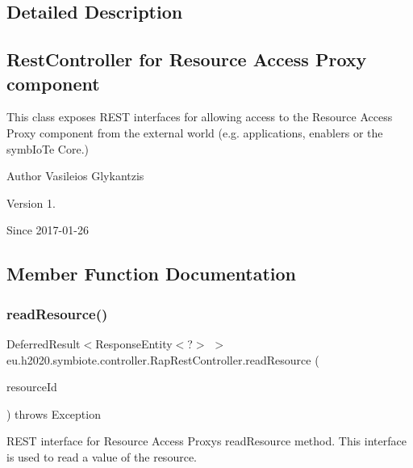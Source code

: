 \subsection{Detailed Description}
\subsection*{Rest\+Controller for Resource Access Proxy component}

This class exposes R\+E\+ST interfaces for allowing access to the Resource Access Proxy component from the external world (e.\+g. applications, enablers or the symb\+Io\+Te Core.)

\begin{DoxyAuthor}{Author}
Vasileios Glykantzis 
\end{DoxyAuthor}
\begin{DoxyVersion}{Version}
1. 
\end{DoxyVersion}
\begin{DoxySince}{Since}
2017-\/01-\/26 
\end{DoxySince}


\subsection{Member Function Documentation}
\mbox{\label{classeu_1_1h2020_1_1symbiote_1_1controller_1_1RapRestController_a02b5cac53d1bb33fb9e89cfc705511f4}} 
\subsubsection{\texorpdfstring{read\+Resource()}{readResource()}}
{\footnotesize\ttfamily Deferred\+Result$<$Response\+Entity$<$?$>$ $>$ eu.\+h2020.\+symbiote.\+controller.\+Rap\+Rest\+Controller.\+read\+Resource (\begin{DoxyParamCaption}\item[{@Path\+Variable String}]{resource\+Id }\end{DoxyParamCaption}) throws Exception}

R\+E\+ST interface for Resource Access Proxy\textquotesingle{}s read\+Resource method. This interface is used to read a value of the resource.


